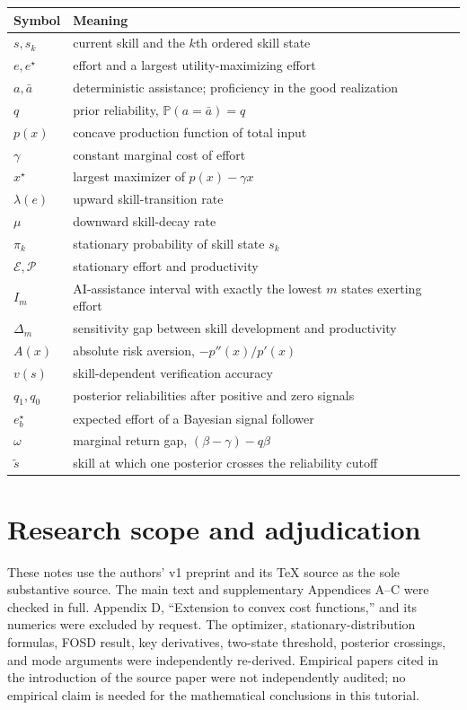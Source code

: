 \documentclass[11pt]{article}
\theoremstyle{tutorial}
\theoremstyle{remark}
\newcommand{\Pp}{\mathbb{P}}
\newcommand{\1}{\mathbb{I}}
\newcommand{\calP}{\mathcal{P}}
\newcommand{\calE}{\mathcal{E}}
\begin{document}
{\small
\begin{longtable}{p{}p{}}
\toprule
Symbol & Meaning\\
\midrule
\endhead
$s,s_k$ & current skill and the $k$th ordered skill state\\
$e,e^\star$ & effort and a largest utility-maximizing effort\\
$a,\bar a$ & deterministic assistance; proficiency in the good realization\\
$q$ & prior reliability, $\Pp(a=\bar a)=q$\\
$p(x)$ & concave production function of total input\\
$\gamma$ & constant marginal cost of effort\\
$x^\star$ & largest maximizer of $p(x)-\gamma x$\\
$\lambda(e)$ & upward skill-transition rate\\
$\mu$ & downward skill-decay rate\\
$\pi_k$ & stationary probability of skill state $s_k$\\
$\calE,\calP$ & stationary effort and productivity\\
$I_m$ & AI-assistance interval with exactly the lowest $m$ states exerting effort\\
$\Delta_m$ & sensitivity gap between skill development and productivity\\
$A(x)$ & absolute risk aversion, $-p''(x)/p'(x)$\\
$v(s)$ & skill-dependent verification accuracy\\
$q_1,q_0$ & posterior reliabilities after positive and zero signals\\
$e_b^\star$ & expected effort of a Bayesian signal follower\\
$\omega$ & marginal return gap, $(\beta-\gamma)-q\beta$\\
$\tilde s$ & skill at which one posterior crosses the reliability cutoff\\
\bottomrule
\end{longtable}
}

\section{Research scope and adjudication}

These notes use the authors' v1 preprint and its TeX source as the sole substantive source.  The main text
and supplementary Appendices A--C were checked in full.  Appendix D, ``Extension to convex cost
functions,'' and its numerics were excluded by request.  The optimizer, stationary-distribution formulas,
FOSD result, key derivatives, two-state threshold, posterior crossings, and mode arguments were independently
re-derived.  Empirical papers cited in the introduction of the source paper were not independently audited;
no empirical claim is needed for the mathematical conclusions in this tutorial.
\end{document}
